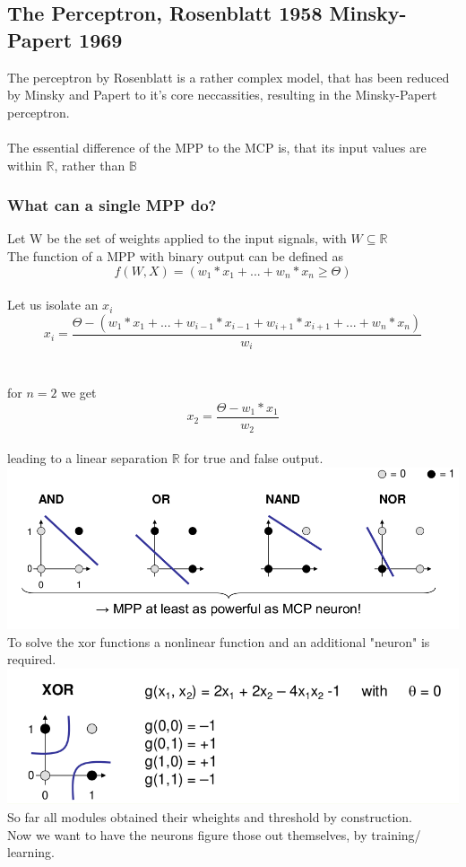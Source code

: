 \documentclass{article}
\begin{document}
\subsection{The Perceptron, Rosenblatt 1958 Minsky-Papert 1969}
The perceptron by Rosenblatt is a rather complex model, that has been reduced by Minsky and Papert to it's core neccassities,
resulting in the Minsky-Papert perceptron.\\
\\
The essential difference of the MPP to the MCP is, that its input values are within $\mathbb{R}$, rather than $\mathbb{B}$\\
\subsubsection{What can a single MPP do?}
Let W be the set of weights applied to the input signals, with $W \subseteq \mathbb{R}$\\
The function of a MPP with binary output can be defined as
$$
f(W, X)  = (w_1*x_1 + ... + w_n*x_n \geq \Theta)
$$
\\
Let us isolate an $x_i$\\
$$
x_i = \frac{ \Theta - (w_1*x_1+ ...+w_{i-1}*x_{i-1}+w_{i+1}*x_{i+1}+... + w_n * x_n)}{w_i}
$$\\
\\
for $n=2$ we get
$$
x_2 = \frac{ \Theta - w_1*x_1}{w_2}
$$\\
leading to a linear separation $\mathbb{R}$ for true and false output.\\
\includegraphics[width=1\textwidth]{MPP.png}
\\
To solve the xor functions a nonlinear function and an additional "neuron" is required.\\
\includegraphics[width=1\textwidth]{XOR.png}
\\
So far all modules obtained their wheights and threshold by construction.\\
Now we want to have the neurons figure those out themselves, by training/ learning.\\
\end{document}
